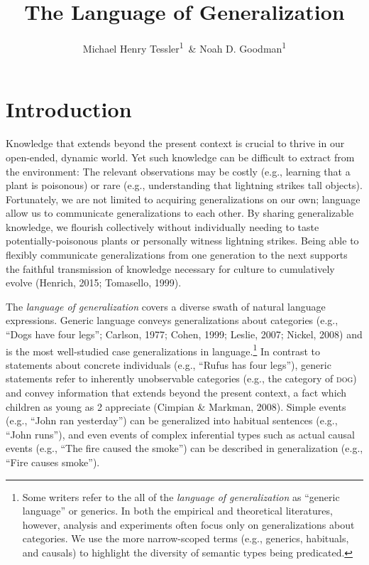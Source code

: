 \documentclass[english,,man,floatsintext]{apa6}
\title{The Language of Generalization}
\author{Michael Henry Tessler\textsuperscript{1}~\& Noah D.
Goodman\textsuperscript{1}}
\date{}
\affiliation{
\vspace{0.5cm}
\textsuperscript{1} Department of Psychology, Stanford University}
\let\rmarkdownfootnote\footnote%
\def\footnote{\protect\rmarkdownfootnote}
\theoremstyle{definition}
\theoremstyle{definition}
\theoremstyle{definition}
\theoremstyle{remark}
\begin{document}
\maketitle

\newcommand{\denote}[1]{\mbox{ $[\![ #1 ]\!]$}}
\newcommand*\diff{\mathop{}\!\mathrm{d}}

\newcommand{\mht}[1]{{\textcolor{Blue}{[mht: #1]}}}
\newcommand{\ndg}[1]{{\textcolor{Green}{[ndg: #1]}}}
\newcommand{\red}[1]{{\textcolor{Red}{#1}}}

\hypertarget{introduction}{%
\section{Introduction}\label{introduction}}

Knowledge that extends beyond the present context is crucial to thrive
in our open-ended, dynamic world. Yet such knowledge can be difficult to
extract from the environment: The relevant observations may be costly
(e.g., learning that a plant is poisonous) or rare (e.g., understanding
that lightning strikes tall objects). Fortunately, we are not limited to
acquiring generalizations on our own; language allow us to communicate
generalizations to each other. By sharing generalizable knowledge, we
flourish collectively without individually needing to taste
potentially-poisonous plants or personally witness lightning strikes.
Being able to flexibly communicate generalizations from one generation
to the next supports the faithful transmission of knowledge necessary
for culture to cumulatively evolve (Henrich, 2015; Tomasello, 1999).

The \emph{language of generalization} covers a diverse swath of natural
language expressions. Generic language conveys generalizations about
categories (e.g., ``Dogs have four legs''; Carlson, 1977; Cohen, 1999;
Leslie, 2007; Nickel, 2008) and is the most well-studied case
generalizations in language.\footnote{Some writers refer to the all of
  the \emph{language of generalization} as \enquote{generic language} or
  generics. In both the empirical and theoretical literatures, however,
  analysis and experiments often focus only on generalizations about
  categories. We use the more narrow-scoped terms (e.g., generics,
  habituals, and causals) to highlight the diversity of semantic types
  being predicated.} In contrast to statements about concrete
individuals (e.g., \enquote{Rufus has four legs}), generic statements
refer to inherently unobservable categories (e.g., the category of
\textsc{dog}) and convey information that extends beyond the present
context, a fact which children as young as 2 appreciate (Cimpian \&
Markman, 2008). Simple events (e.g., \enquote{John ran yesterday}) can
be generalized into habitual sentences (e.g., \enquote{John runs}), and
even events of complex inferential types such as actual causal events
(e.g., \enquote{The fire caused the smoke}) can be described in
generalization (e.g., \enquote{Fire causes smoke}).
\end{document}
